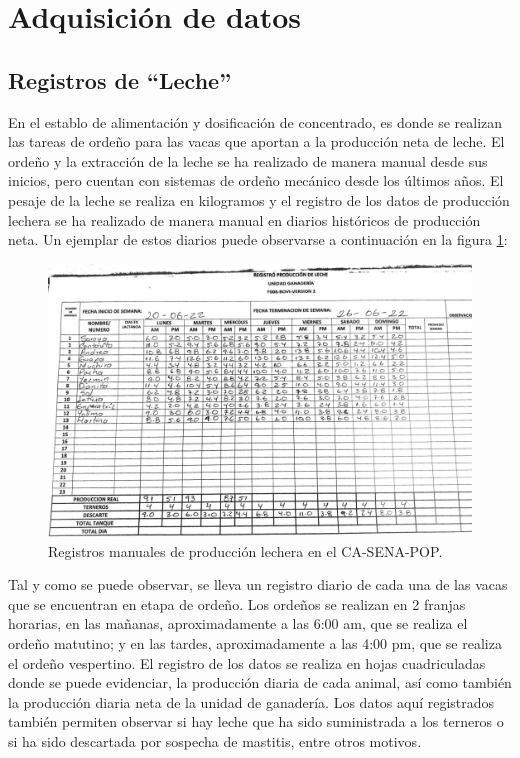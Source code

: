 
\section{Adquisición de datos}
\subsection{Registros de ``Leche''}
En el establo de alimentación y dosificación de concentrado, es donde se realizan las tareas de ordeño para las vacas que aportan a la producción neta de leche. El ordeño y la extracción de la leche se ha realizado de manera manual desde sus inicios, pero cuentan con sistemas de ordeño mecánico desde los últimos años. El pesaje de la leche se realiza en kilogramos y el registro de los datos de producción lechera se ha realizado de manera manual en diarios históricos de producción neta. Un ejemplar de estos diarios puede observarse a continuación en la figura \ref{regleche1png}:

\begin{figure}[H]
	 \begin{center}
	 \includegraphics[scale=0.515]{img/regleche1.jpg}
	 \end{center}
	 \caption{Registros manuales de producción lechera en el CA-SENA-POP. \label{regleche1png}}
	\end{figure}
	
Tal y como se puede observar, se lleva un registro diario de cada una de las vacas que se encuentran en etapa de ordeño. Los ordeños se realizan en 2 franjas horarias, en las mañanas, aproximadamente a las 6:00 am, que se realiza el ordeño matutino; y en las tardes, aproximadamente a las 4:00 pm, que se realiza el ordeño vespertino. El registro de los datos se realiza en hojas cuadriculadas donde se puede evidenciar, la producción diaria de cada animal, así como también la producción diaria neta de la unidad de ganadería. Los datos aquí registrados también permiten observar si hay leche que ha sido suministrada a los terneros o si ha sido descartada por sospecha de mastitis, entre otros motivos. \\
	
